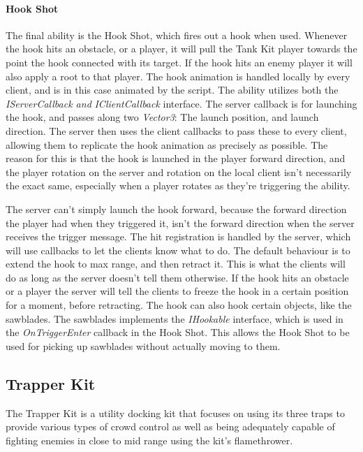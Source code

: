 \paragraph{Hook Shot}
The final ability is the Hook Shot, which fires out a hook when used. Whenever the hook hits an obstacle, or a player, it will pull the Tank Kit player towards the point the hook connected with its target. If the hook hits an enemy player it will also apply a root to that player. The hook animation is handled locally by every client, and is in this case animated by the script. The ability utilizes both the \emph{IServerCallback and }\emph{IClientCallback} interface. The server callback is for launching the hook, and passes along two \emph{Vector3}: The launch position, and launch direction. The server then uses the client callbacks to pass these to every client, allowing them to replicate the hook animation as precisely as possible. The reason for this is that the hook is launched in the player forward direction, and the player rotation on the server and rotation on the local client isn't necessarily the exact same, especially when a player rotates as they're triggering the ability. 

The server can't simply launch the hook forward, because the forward direction the player had when they triggered it, isn't the forward direction when the server receives the trigger message. The hit registration is handled by the server, which will use callbacks to let the clients know what to do. The default behaviour is to extend the hook to max range, and then retract it. This is what the clients will do as long as the server doesn't tell them otherwise. If the hook hits an obstacle or a player the server will tell the clients to freeze the hook in a certain position for a moment, before retracting. The hook can also hook certain objects, like the sawblades. The sawblades implements the \emph{IHookable} interface, which is used in the \emph{OnTriggerEnter} callback in the Hook Shot. This allows the Hook Shot to be used for picking up sawblades without actually moving to them.

\subsection{Trapper Kit}
The Trapper Kit is a utility docking kit that focuses on using its three traps to provide various types of crowd control as well as being adequately capable of fighting enemies in close to mid range using the kit's flamethrower.  


